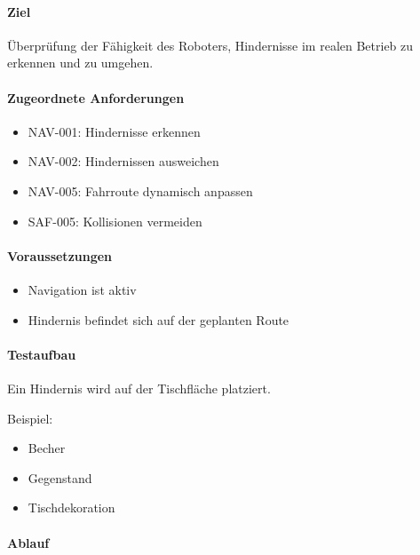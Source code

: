 \documentclass[
  a4paper,
  12pt,
  DIV=12,        %
  parskip=half,  %
  headings=small %
]{scrartcl}
\theoremstyle{definition}
\providecommand{\tightlist}{%
  \setlength{\itemsep}{0pt}\setlength{\parskip}{0pt}}
\theoremstyle{definition}
\begin{document}
\paragraph{Ziel}\label{ziel-26}

Überprüfung der Fähigkeit des Roboters, Hindernisse im realen Betrieb zu
erkennen und zu umgehen.

\paragraph{Zugeordnete
Anforderungen}\label{zugeordnete-anforderungen-26}

\begin{itemize}
\tightlist
\item
  NAV-001: Hindernisse erkennen
\item
  NAV-002: Hindernissen ausweichen
\item
  NAV-005: Fahrroute dynamisch anpassen
\item
  SAF-005: Kollisionen vermeiden
\end{itemize}

\paragraph{Voraussetzungen}\label{voraussetzungen-25}

\begin{itemize}
\tightlist
\item
  Navigation ist aktiv
\item
  Hindernis befindet sich auf der geplanten Route
\end{itemize}

\paragraph{Testaufbau}\label{testaufbau-2}

Ein Hindernis wird auf der Tischfläche platziert.

Beispiel:

\begin{itemize}
\tightlist
\item
  Becher
\item
  Gegenstand
\item
  Tischdekoration
\end{itemize}

\paragraph{Ablauf}\label{ablauf-26}
\end{document}
